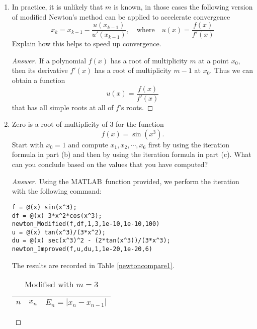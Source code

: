 \begin{enumerate}
\begin{proof}
\[		\frac{(x_{k-1}-x^*)h(x_{k-1})}{h(x_{k-1})+\frac{1}{m}(x_{k-1}-x^*)h'(x_{k-1})}. \]
		Define the error term \(E_k=x_k-x^*\), then
		\[ E_k = E_{k-1} \left( 1 - 
		\frac{1}{1+\frac{1}{m} E_{k-1}\frac{h'(x^*+E_{k-1})}{h(x^*+E_{k-1})}}\right). \]
		A first order approximation gives
		\[ E_k \approx E_{k-1}^2 \cdot
		\frac{h'(x^*+E_{k-1})}{m\cdot h(x^*+E_{k-1})}. \]
		So the quadratic convergence is proved.
	\end{proof}
	\item In practice, it is unlikely that $m$ is known, in those cases the following version of modified Newton's method can be applied to accelerate convergence
	\[ x_k=x_{k-1}-\frac{u(x_{k-1})}{u'(x_{k-1})}, \quad \text{where} \quad u(x)=\frac{f(x)}{f'(x)} \]
	Explain how this helps to speed up convergence.
	\begin{proof}[Answer]
		 If a polynomial \(f(x)\) has a root of multiplicity \(m\) at a point \(x_0\), then its derivative \(f'(x)\) has a root of multiplicity \(m-1\) at \(x_0\).
		 Thus we can obtain a function
		 \[ u(x)=\frac{f(x)}{f'(x)} \]
		 that  has  all  simple roots at all of \(f\)'s roots.
	\end{proof}
	\item Zero is a root of multiplicity of 3 for the function
	\[ f(x)=\sin(x^3). \]
	Start with \(x_0=1\) and compute \(x_1, x_2, \cdots, x_6\) first by using the iteration formula in part (b) and then by using the iteration formula in part (c).
	What can you conclude based on the values that you have computed?
	\begin{proof}[Answer]
	Using the MATLAB\texttrademark\ function provided, we perform the iteration with the following command:
	\begin{lstlisting}[style=Matlab-editor]
f = @(x) sin(x^3);
df = @(x) 3*x^2*cos(x^3);
newton_Modified(f,df,1,3,1e-10,1e-10,100)
u = @(x) tan(x^3)/(3*x^2);
du = @(x) sec(x^3)^2 - (2*tan(x^3))/(3*x^3);
newton_Improved(f,u,du,1,1e-20,1e-20,6)
	\end{lstlisting}
	The results are recorded in Table \ref{newtoncompare1}.
	\ifnum{}
		\begin{table}[H]
		\centering
		\begin{subtable}[t]{.8\textwidth}
	\else
		\begin{table}[htbp]
		\begin{subtable}[t]{.49\linewidth}	
	\fi		
			\centering
			\caption{Modified with \(m=3\)}
			\begin{tabular}[t]{|c|c|c|}
			\hline
			\normalsize	$n$	&	\normalsize	\(x_n\)	&	\normalsize	\(E_n=|x_n-x_{n-1}|\)	\\	\hline

\end{tabular}
\end{subtable}
\end{table}
\end{subtable}
\end{table}
\end{proof}
\end{enumerate}
